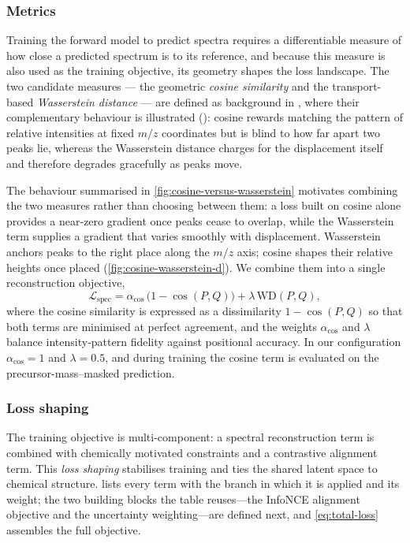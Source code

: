 \subsubsection{Metrics}

Training the forward model to predict spectra requires a differentiable measure of how close a predicted spectrum is to its reference, and because this measure is also used as the training objective, its geometry shapes the loss landscape.
The two candidate measures --- the geometric \emph{cosine similarity} and the transport-based \emph{Wasserstein distance} --- are defined as background in , where their complementary behaviour is illustrated (): cosine rewards matching the pattern of relative intensities at fixed $m/z$ coordinates but is blind to how far apart two peaks lie, whereas the Wasserstein distance charges for the displacement itself and therefore degrades gracefully as peaks move.

The behaviour summarised in \cref{fig:cosine-versus-wasserstein} motivates combining the two measures rather than choosing between them: a loss built on cosine alone provides a near-zero gradient once peaks cease to overlap, while the Wasserstein term supplies a gradient that varies smoothly with displacement.
Wasserstein anchors peaks to the right place along the $m/z$ axis; cosine shapes their relative heights once placed (\cref{fig:cosine-wasserstein-d}). We combine them into a single reconstruction objective,
\begin{equation}
    \label{eq:combined-loss}
    \mathcal{L}_{\mathrm{spec}} = \alpha_{\cos}\,\bigl(1 - \cos(P,Q)\bigr) + \lambda\,\mathrm{WD}(P,Q),
\end{equation}
where the cosine similarity is expressed as a dissimilarity $1 - \cos(P,Q)$ so that both terms are minimised at perfect agreement, and the weights $\alpha_{\cos}$ and $\lambda$ balance intensity-pattern fidelity against positional accuracy. In our configuration $\alpha_{\cos}=1$ and $\lambda=0.5$, and during training the cosine term is evaluated on the precursor-mass--masked prediction.

\subsubsection{Loss shaping}

The training objective is multi-component: a spectral reconstruction term is combined with chemically motivated constraints and a contrastive alignment term. This \emph{loss shaping} stabilises training and ties the shared latent space to chemical structure.  lists every term with the branch in which it is applied and its weight; the two building blocks the table reuses---the InfoNCE alignment objective and the uncertainty weighting---are defined next, and \cref{eq:total-loss} assembles the full objective.

